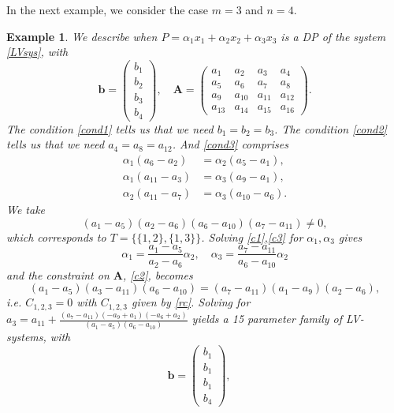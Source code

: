 \documentclass{article}
\newcounter{NN}
\newtheorem{example}[NN]{Example}
\def\A{\mathbf{A}}
\def\b{{\mathbf b}}
\begin{document}
In the next example, we consider the case $m=3$ and $n=4$.
\begin{example}
We describe when
$P=\alpha_1x_1+\alpha_2x_2+\alpha_3x_3$ is a DP of the system \eqref{LVsys}, with
\begin{equation} \label{NS}
\b=\begin{pmatrix} b_1 \\ b_2 \\ b_3 \\ b_4 \end{pmatrix},\quad \A=\begin{pmatrix}
a_{1} & a_{2} & a_{3} & a_{4} 
\\
 a_{5} & a_{6} & a_{7} & a_{8} 
\\
 a_{9} & a_{10} & a_{11} & a_{12} 
\\
 a_{13} & a_{14} & a_{15} & a_{16} 
\end{pmatrix}.
\end{equation}
The condition \eqref{cond1} tells us that we need $b_1=b_2=b_3$. The condition \eqref{cond2} tells us that we need $a_{4}=a_{8}=a_{12}$. And \eqref{cond3} comprises
\begin{align}
\alpha_{1} \left(a_{6}-a_{2}\right)&= 
\alpha_{2} \left(a_{5}-a_{1}\right)
,\label{c1}\\
\alpha_{1} \left(a_{11}-a_{3}\right)&= 
\alpha_{3} \left(a_{9}-a_{1}\right)
,\label{c2}\\
\alpha_{2} \left(a_{11}-a_{7}\right)&= 
\alpha_{3} \left(a_{10}-a_{6}\right)
.\label{c3}
\end{align}
We take
\begin{equation} \label{cds}
(a_{1}-a_{5})(a_{2}-a_{6})(a_{6}-a_{10})(a_{7} -a_{11})\neq 0,
\end{equation}
which corresponds to $T=\{\{1,2\},\{1,3\}\}$. Solving \eqref{c1},\eqref{c3} for $\alpha_1,\alpha_3$ gives
\[
\alpha_{1} = 
\frac{a_{1}-a_{5}}{a_2-a_{6}}\alpha_{2},\quad \alpha_{3}
 = \frac{a_{7}-a_{11}}{a_{6}-a_{10}}\alpha_{2} 
\]
and the constraint on $\A$, \eqref{c2}, becomes
\[
\left(a_{1}-a_{5}\right) \left(a_3-a_{11}\right) \left(a_{6}-a_{10}\right)
 = 
\left(a_{7}-a_{11}\right) \left(a_1-a_{9}\right) \left(a_2-a_{6}\right),
\]
i.e. $C_{1,2,3}=0$ with $C_{1,2,3}$ given by \eqref{rc}. Solving for $
a_3=a_{11}+\frac{\left(a_{7}-a_{11}\right) \left(-a_{9}+a_{1}\right) \left(-a_{6}+a_{2}\right)}{\left(a_{1}-a_{5}\right) \left(a_{6}-a_{10}\right)}$
yields a 15 parameter family of LV-systems, with
\begin{equation} \label{JOS}
\b=\begin{pmatrix} b_1 \\ b_1 \\ b_1 \\ b_4 \end{pmatrix},\quad

\end{equation}
\end{example}
\end{document}
